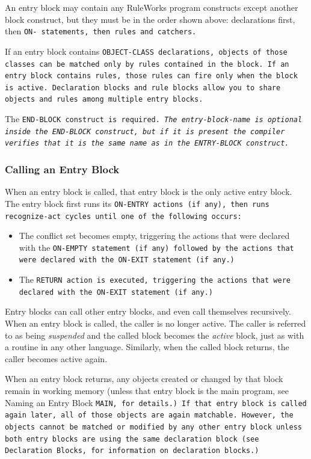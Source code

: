An entry block may contain any RuleWorks program constructs except
another block construct, but they must be in the order shown above:
declarations first, then \tt{ON-} statements, then rules and catchers.

If an entry block contains \tt{OBJECT-CLASS} declarations, objects of
those classes can be matched only by rules contained in the block.  If
an entry block contains rules, those rules can fire only when the
block is active.  Declaration blocks and rule blocks allow you to
share objects and rules among multiple entry blocks.

The \tt{END-BLOCK} construct is required. \it{The entry-block-name} is
optional inside the \tt{END-BLOCK} construct, but if it is present the
compiler verifies that it is the same name as in the \tt{ENTRY-BLOCK}
construct.

\subsubsection{Calling an Entry Block}

When an entry block is called, that entry block is the only active
entry block. The entry block first runs its \tt{ON-ENTRY} actions (if
any), then runs recognize-act cycles until one of the following
occurs:
\begin{itemize}
\item The conflict set becomes empty, triggering the actions that were
  declared with the \tt{ON-EMPTY} statement (if any) followed by the
  actions that were declared with the \tt{ON-EXIT} statement (if any.)
\item The \tt{RETURN} action is executed, triggering the actions that
  were declared with the \tt{ON-EXIT} statement (if any.)
\end{itemize}

Entry blocks can call other entry blocks, and even call themselves
recursively. When an entry block is called, the caller is no longer
active. The caller is referred to as being \emph{suspended} and the
called block becomes the \emph{active} block, just as with a routine
in any other language. Similarly, when the called block returns, the
caller becomes active again.

When an entry block returns, any objects created or changed by that
block remain in working memory (unless that entry block is the main
program, see Naming an Entry Block \tt{MAIN}, for details.) If
that entry block is called again later, all of those objects are again
matchable. However, the objects cannot be matched or modified by any
other entry block unless both entry blocks are using the same
declaration block (see Declaration Blocks, for information on
declaration blocks.)

